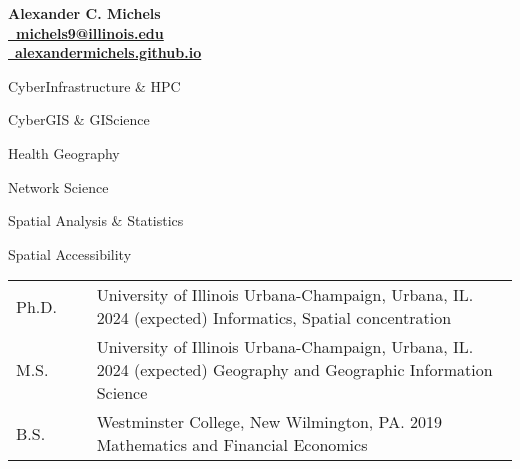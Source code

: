 \documentclass{acmcv}
\begin{document}
	\begin{multicols}{2}
		\vspace*{.15cm}
		\textbf{\LARGE Alexander C. Michels} \\
		\columnbreak
		\hfill\href{mailto:michels9@illinois.edu}{\textbf{\faEnvelope~michels9@illinois.edu}} \\
		\hfill\href{http://alexandermichels.github.io}{\faGlobeAmericas~\textbf{alexandermichels.github.io}} \\
	\end{multicols}

	
	\begin{multicols}{2}
		\begin{titemize}
			\item CyberInfrastructure \& HPC
			\item CyberGIS \& GIScience
			\item Health Geography
			\item Network Science
			\item Spatial Analysis \& Statistics
			\item Spatial Accessibility
		\end{titemize}
	\end{multicols}


    \begin{longtable}{p{0.16\linewidth} p{0.84\linewidth}}
        Ph.D. & University of Illinois Urbana-Champaign, Urbana, IL. 2024 (expected) \newline Informatics, Spatial concentration \\

        M.S. & University of Illinois Urbana-Champaign, Urbana, IL. 2024 (expected) \newline Geography and Geographic Information Science\\

        B.S. & Westminster College, New Wilmington, PA. 2019 \newline Mathematics and Financial Economics\\
    \end{longtable}
\end{document}

